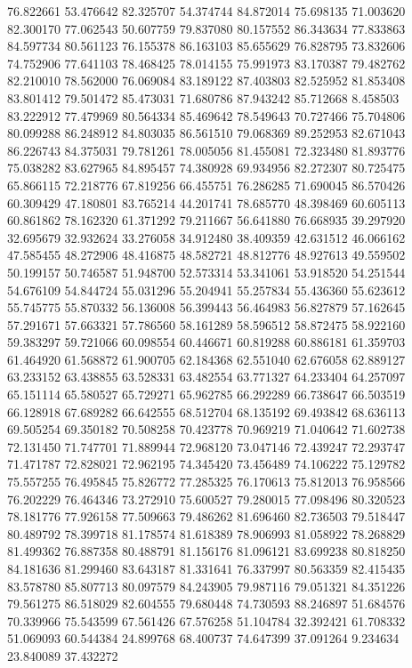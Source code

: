 76.822661
53.476642
82.325707
54.374744
84.872014
75.698135
71.003620
82.300170
77.062543
50.607759
79.837080
80.157552
86.343634
77.833863
84.597734
80.561123
76.155378
86.163103
85.655629
76.828795
73.832606
74.752906
77.641103
78.468425
78.014155
75.991973
83.170387
79.482762
82.210010
78.562000
76.069084
83.189122
87.403803
82.525952
81.853408
83.801412
79.501472
85.473031
71.680786
87.943242
85.712668
8.458503
83.222912
77.479969
80.564334
85.469642
78.549643
70.727466
75.704806
80.099288
86.248912
84.803035
86.561510
79.068369
89.252953
82.671043
86.226743
84.375031
79.781261
78.005056
81.455081
72.323480
81.893776
75.038282
83.627965
84.895457
74.380928
69.934956
82.272307
80.725475
65.866115
72.218776
67.819256
66.455751
76.286285
71.690045
86.570426
60.309429
47.180801
83.765214
44.201741
78.685770
48.398469
60.605113
60.861862
78.162320
61.371292
79.211667
56.641880
76.668935
39.297920
32.695679
32.932624
33.276058
34.912480
38.409359
42.631512
46.066162
47.585455
48.272906
48.416875
48.582721
48.812776
48.927613
49.559502
50.199157
50.746587
51.948700
52.573314
53.341061
53.918520
54.251544
54.676109
54.844724
55.031296
55.204941
55.257834
55.436360
55.623612
55.745775
55.870332
56.136008
56.399443
56.464983
56.827879
57.162645
57.291671
57.663321
57.786560
58.161289
58.596512
58.872475
58.922160
59.383297
59.721066
60.098554
60.446671
60.819288
60.886181
61.359703
61.464920
61.568872
61.900705
62.184368
62.551040
62.676058
62.889127
63.233152
63.438855
63.528331
63.482554
63.771327
64.233404
64.257097
65.151114
65.580527
65.729271
65.962785
66.292289
66.738647
66.503519
66.128918
67.689282
66.642555
68.512704
68.135192
69.493842
68.636113
69.505254
69.350182
70.508258
70.423778
70.969219
71.040642
71.602738
72.131450
71.747701
71.889944
72.968120
73.047146
72.439247
72.293747
71.471787
72.828021
72.962195
74.345420
73.456489
74.106222
75.129782
75.557255
76.495845
75.826772
77.285325
76.170613
75.812013
76.958566
76.202229
76.464346
73.272910
75.600527
79.280015
77.098496
80.320523
78.181776
77.926158
77.509663
79.486262
81.696460
82.736503
79.518447
80.489792
78.399718
81.178574
81.618389
78.906993
81.058922
78.268829
81.499362
76.887358
80.488791
81.156176
81.096121
83.699238
80.818250
84.181636
81.299460
83.643187
81.331641
76.337997
80.563359
82.415435
83.578780
85.807713
80.097579
84.243905
79.987116
79.051321
84.351226
79.561275
86.518029
82.604555
79.680448
74.730593
88.246897
51.684576
70.339966
75.543599
67.561426
67.576258
51.104784
32.392421
61.708332
51.069093
60.544384
24.899768
68.400737
74.647399
37.091264
9.234634
23.840089
37.432272
